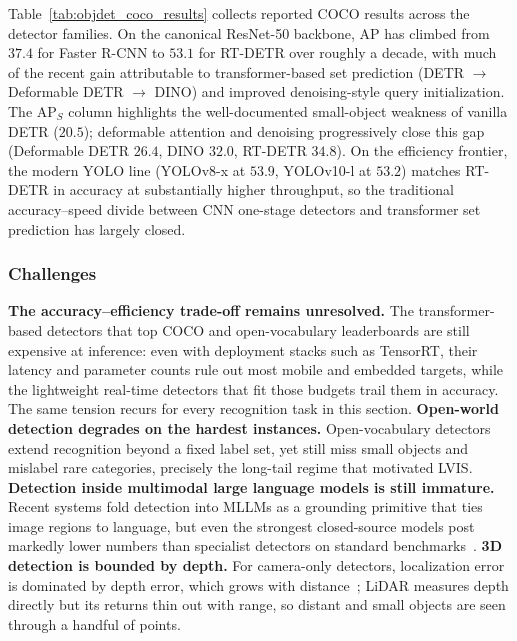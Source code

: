 Table~\ref{tab:objdet_coco_results} collects reported COCO results across the detector families.
On the canonical ResNet-50 backbone, AP has climbed from $37.4$ for Faster R-CNN to $53.1$ for RT-DETR over roughly a decade, with much of the recent gain attributable to transformer-based set prediction (DETR $\rightarrow$ Deformable DETR $\rightarrow$ DINO) and improved denoising-style query initialization.
The AP$_S$ column highlights the well-documented small-object weakness of vanilla DETR ($20.5$); deformable attention and denoising progressively close this gap (Deformable DETR $26.4$, DINO $32.0$, RT-DETR $34.8$).
On the efficiency frontier, the modern YOLO line (YOLOv8-x at $53.9$, YOLOv10-l at $53.2$) matches RT-DETR in accuracy at substantially higher throughput, so the traditional accuracy--speed divide between CNN one-stage detectors and transformer set prediction has largely closed.



\subsubsection{Challenges}
\textbf{The accuracy--efficiency trade-off remains unresolved.}
The transformer-based detectors that top COCO and open-vocabulary leaderboards are still expensive at inference: even with deployment stacks such as TensorRT, their latency and parameter counts rule out most mobile and embedded targets, while the lightweight real-time detectors that fit those budgets trail them in accuracy. The same tension recurs for every recognition task in this section.
\textbf{Open-world detection degrades on the hardest instances.}
Open-vocabulary detectors extend recognition beyond a fixed label set, yet still miss small objects and mislabel rare categories, precisely the long-tail regime that motivated LVIS.
\textbf{Detection inside multimodal large language models is still immature.} Recent systems fold detection into MLLMs as a grounding primitive that ties image regions to language, but even the strongest closed-source models post markedly lower numbers than specialist detectors on standard benchmarks~\cite{zhu2024survey, wu2024towards}.
\textbf{3D detection is bounded by depth.} For camera-only detectors, localization error is dominated by depth error, which grows with distance~\cite{ma2021delving}; LiDAR measures depth directly but its returns thin out with range, so distant and small objects are seen through a handful of points.

